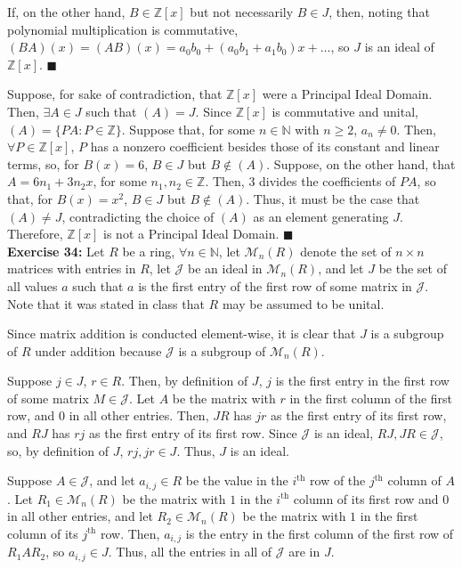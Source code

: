 \documentclass{article}%
\begin{document}
If, on the other hand, $B \in \mathbb{Z}[x]$ but not necessarily $B \in J$,
then, noting that polynomial multiplication is commutative,
$(BA)(x) = (AB)(x) = a_0b_0 + (a_0b_1 + a_1b_0)x + \ldots$, so $J$ is an
ideal of $\mathbb{Z}[x]$. \qquad $\blacksquare$

Suppose, for sake of contradiction, that $\mathbb{Z}[x]$ were a Principal
Ideal Domain. Then, $\exists A \in J$ such that $(A) = J$. Since
$\mathbb{Z}[x]$ is commutative and unital, $(A) = \{PA : P \in
\mathbb{Z}\}$. Suppose that, for some $n \in \mathbb{N}$ with $n \geq 2$,
$a_n \neq 0$. Then, $\forall P \in \mathbb{Z}[x]$, $P$ has a nonzero
coefficient besides those of its constant and linear terms, so, for
$B(x) = 6$, $B \in J$ but $B \not \in (A)$. Suppose, on the other hand, that
$A = 6n_1 + 3n_2x$, for some $n_1, n_2 \in \mathbb{Z}$. Then, $3$ divides
the coefficients of $PA$, so that, for $B(x) = x^2$, $B \in J$ but $B \not \in
(A)$. Thus, it must be the case that $(A) \neq J$, contradicting the
choice of $(A)$ as an element generating $J$. Therefore, $\mathbb{Z}[x]$ is
not a Principal Ideal Domain. \qquad $\blacksquare$ \\

\textbf{Exercise 34:} Let $R$ be a ring, $\forall n \in \mathbb{N}$, let
$\mathcal{M}_n(R)$ denote the set of $n \times n$ matrices with entries in
$R$, let $\mathcal{J}$ be an ideal in $\mathcal{M}_n(R)$, and let $J$ be the
set of all values $a$ such that $a$ is the first entry of the first row of
some matrix in $\mathcal{J}$. Note that it was stated in class that $R$ may
be assumed to be unital.

Since matrix addition is conducted element-wise, it is clear that $J$ is a
subgroup of $R$ under addition because $\mathcal{J}$ is a subgroup of
$\mathcal{M}_n(R)$.

Suppose $j \in J$, $r \in R$. Then, by definition of $J$, $j$ is the first
entry in the first row of some matrix $M \in \mathcal{J}$. Let $A$ be the
matrix with $r$ in the first column of the first row, and $0$ in all other
entries. Then, $JR$ has $jr$ as the first entry of its first row, and $RJ$ has
$rj$ as the first entry of its first row. Since $\mathcal{J}$ is an ideal,
$RJ, JR \in \mathcal{J}$, so, by definition of $J$, $rj, jr \in J$. Thus, $J$
is an ideal.

Suppose $A \in \mathcal{J}$, and let $a_{i,j} \in R$ be the value in the
$i^{\mbox{th}}$ row of the $j^{\mbox{th}}$ column of $A$. Let $R_1 \in
\mathcal{M}_n(R)$ be the matrix with $1$ in the $i^{\mbox{th}}$ column of its
first row and $0$ in all other entries, and let $R_2 \in \mathcal{M}_n(R)$ be
the matrix with $1$ in the first column of its $j^{\mbox{th}}$ row. Then,
$a_{i,j}$ is the entry in the first column of the first row of $R_1AR_2$, so
$a_{i,j} \in J$. Thus, all the entries in all of $\mathcal{J}$ are in $J$.
\end{document}
